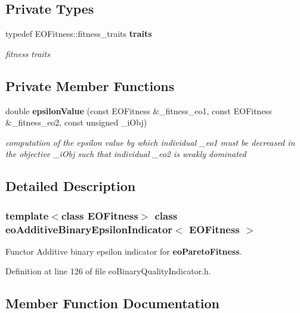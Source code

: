 \subsection*{Private Types}
\begin{CompactItemize}
\item 
typedef EOFitness::fitness\_\-traits {\bf traits}\label{classeoAdditiveBinaryEpsilonIndicator_c6d4c79183683a05183a31fcb7f533f1}

\begin{CompactList}\small\item\em fitness traits \item\end{CompactList}\end{CompactItemize}
\subsection*{Private Member Functions}
\begin{CompactItemize}
\item 
double {\bf epsilon\-Value} (const EOFitness \&\_\-fitness\_\-eo1, const EOFitness \&\_\-fitness\_\-eo2, const unsigned \_\-i\-Obj)
\begin{CompactList}\small\item\em computation of the epsilon value by which individual \_\-eo1 must be decreased in the objective \_\-i\-Obj such that individual \_\-eo2 is weakly dominated \item\end{CompactList}\end{CompactItemize}


\subsection{Detailed Description}
\subsubsection*{template$<$class EOFitness$>$ class eo\-Additive\-Binary\-Epsilon\-Indicator$<$ EOFitness $>$}

Functor Additive binary epsilon indicator for {\bf eo\-Pareto\-Fitness}. 



Definition at line 126 of file eo\-Binary\-Quality\-Indicator.h.

\subsection{Member Function Documentation}
